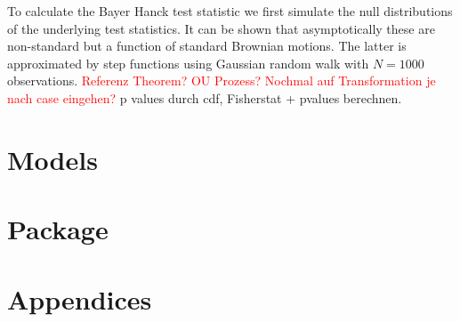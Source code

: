 \documentclass[12pt,a4paper]{article}
\begin{document}
To calculate the Bayer Hanck test statistic we first simulate the null
distributions of the underlying test statistics. It can be shown that
asymptotically these are non-standard but a function of standard
Brownian motions. The latter is approximated by step functions using
Gaussian random walk with \(N = 1000\) observations.
\textcolor{red}{Referenz Theorem? OU Prozess? Nochmal auf Transformation je nach case eingehen?}
p values durch cdf, Fisherstat + pvalues berechnen.

\hypertarget{models}{%
\section{Models}\label{models}}

\hypertarget{package}{%
\section{Package}\label{package}}

\pagebreak

\setcounter{page}{3}
\printbibliography[title = References]
\cleardoublepage

\begin{refsection}
\nocite{R-base}
\nocite{R-stargazer}
\nocite{R-stringr}
\nocite{R-tidyr}
\nocite{R-dplyr}
\nocite{R-glmnet}
\nocite{R-class}
\nocite{R-MASS}
\nocite{R-plm}
\nocite{R-leaps}
\nocite{R-caret}
\nocite{R-tree}
\nocite{R-gbm}
\nocite{R-plotmo}
\nocite{R-pls}
\nocite{R-splines}
\nocite{R-tictoc}
\nocite{R-plotly}
\nocite{R-inspectdf}
\nocite{R-rpart}
\nocite{R-rpart.plot}
\nocite{R-stargazer}
\nocite{R-knitr}
\nocite{R-purrr}
\nocite{R-randomForest}
\nocite{R-rstudioapi}





\nocite{R-Studio}

\printbibliography[title = Software-References]
\end{refsection}

\cleardoublepage
\appendix
\setcounter{table}{0}
\setcounter{figure}{0}
\renewcommand{\thetable}{A\arabic{table}}
\renewcommand{\thefigure}{A\arabic{figure}}


\hypertarget{appendices}{%
\section{Appendices}\label{appendices}}
\end{document}
